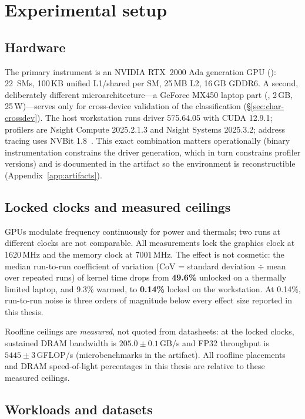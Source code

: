 \section{Experimental setup}
\label{sec:met-setup}

\subsection{Hardware}

The primary instrument is an NVIDIA RTX~2000 Ada generation GPU
(): 22~SMs, 100\,KB unified L1/shared per SM, 25\,MB L2, 16\,GB
GDDR6. A second, deliberately different microarchitecture---a GeForce MX450
laptop part (, 2\,GB, 25\,W)---serves only for cross-device
validation of the classification (\S\ref{sec:char-crossdev}). The host
workstation runs driver 575.64.05 with CUDA 12.9.1; profilers are Nsight
Compute 2025.2.1.3 and Nsight Systems 2025.3.2; address tracing uses NVBit
1.8~\cite{villa2019nvbit}. This exact combination matters operationally
(binary instrumentation constrains the driver generation, which in turn
constrains profiler versions) and is documented in the artifact so the
environment is reconstructible (Appendix~\ref{app:artifacts}).

\subsection{Locked clocks and measured ceilings}
\label{sec:met-clocks}

GPUs modulate frequency continuously for power and thermals; two runs at
different clocks are not comparable. All measurements lock the graphics
clock at 1620\,MHz and the memory clock at 7001\,MHz. The effect is not
cosmetic: the median run-to-run coefficient of variation (CoV = standard
deviation $\div$ mean over repeated runs) of kernel time drops from
\textbf{49.6\%} unlocked on a thermally limited laptop, and 9.3\% warmed, to
\textbf{0.14\%} locked on the workstation. At 0.14\%, run-to-run noise is
three orders of magnitude below every effect size reported in this thesis.

Roofline ceilings are \emph{measured}, not quoted from datasheets: at the
locked clocks, sustained DRAM bandwidth is $205.0 \pm 0.1$\,GB/s and FP32
throughput is $5445 \pm 3$\,GFLOP/s (microbenchmarks in the artifact). All
roofline placements and DRAM speed-of-light percentages in this thesis are
relative to these measured ceilings.

\subsection{Workloads and datasets}
\label{sec:met-datasets}

